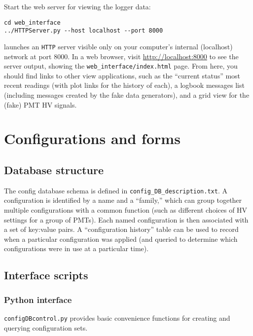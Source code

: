 \documentclass[12pt,english]{article}
\newcommand{\cd}[1]{\texttt{#1}}
\begin{document}
Start the web server for viewing the logger data:
\begin{verbatim}
cd web_interface
../HTTPServer.py --host localhost --port 8000
\end{verbatim}
launches an \cd{HTTP} server visible only on your computer's internal (localhost) network at port 8000.
In a web browser, visit \url{http://localhost:8000} to see the server output,
	showing the \cd{web\_interface/index.html} page.
From here, you should find links to other view applications,
	such as the ``current status'' most recent readings (with plot links for the history of each),
	a logbook messages list (including messages created by the fake data generators),
	and a grid view for the (fake) PMT HV signals.

%
%
%
\section{Configurations and forms}

%
%
\subsection{Database structure}

The config database schema is defined in \cd{config\_DB\_description.txt}.
A configuration is identified by a name and a ``family,'' which can group together multiple
	configurations with a common function (such as different choices of HV settings for a group of PMTs).
Each named configuration is then associated with a set of key:value pairs.
A ``configuration history'' table can be used to record when a particular configuration was applied
	(and queried to determine which configurations were in use at a particular time).

%
%
\subsection{Interface scripts}

%
\subsubsection{Python interface}

\cd{configDBcontrol.py} provides basic convenience functions for creating and querying configuration sets.
\end{document}
